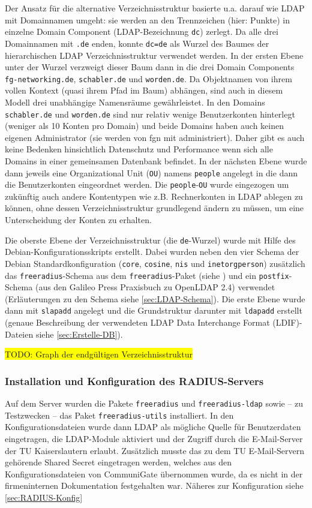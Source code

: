 \documentclass[11pt,a4paper,titlepage=firstiscover,headsepline,bibtotoc]{scrartcl} %
\newcommand{\hilight}[1]{\colorbox{yellow}{#1}} %
\begin{document}
Der Ansatz für die alternative Verzeichnisstruktur basierte u.a. darauf wie LDAP mit Domainnamen umgeht: sie werden an den Trennzeichen (hier: Punkte) in einzelne Domain Component (LDAP-Bezeichnung \texttt{dc}) zerlegt. Da alle drei Domainnamen mit \texttt{.de} enden, konnte \texttt{dc=de} als Wurzel des Baumes der hierarchischen LDAP Verzeichnisstruktur verwendet werden. In der ersten Ebene unter der Wurzel verzweigt dieser Baum dann in die drei Domain Components  \texttt{fg-networking.de}, \texttt{schabler.de} und \texttt{worden.de}. Da Objektnamen von ihrem vollen Kontext (quasi ihrem Pfad im Baum) abhängen, sind auch in diesem Modell drei unabhängige Namensräume gewährleistet. In den Domains \texttt{schabler.de} und \texttt{worden.de} sind nur relativ wenige Benutzerkonten hinterlegt (weniger als 10 Konten pro Domain) und beide Domains haben auch keinen eigenen Administrator (sie werden von fgn mit administriert). Daher gibt es auch keine Bedenken hinsichtlich Datenschutz und Performance wenn sich alle Domains in einer gemeinsamen Datenbank befindet. In der nächsten Ebene wurde dann jeweils eine Organizational Unit (\texttt{OU}) namens \texttt{people} angelegt in die dann die Benutzerkonten eingeordnet werden. Die \texttt{people}-\texttt{OU} wurde eingezogen um zukünftig auch andere Kontentypen wie z.B. Rechnerkonten in LDAP ablegen zu können, ohne dessen Verzeichnisstruktur grundlegend ändern zu müssen, um eine Unterscheidung der Konten zu erhalten.

Die oberste Ebene der Verzeichnisstruktur (die \texttt{de}-Wurzel) wurde mit Hilfe des Debian-Konfigurationsskripts erstellt. Dabei wurden neben den vier Schema der Debian Standardkonfiguration (\texttt{core}, \texttt{cosine}, \texttt{nis} und \texttt{inetorgperson}) zusätzlich das \texttt{freeradius}-Schema aus dem \texttt{freeradius}-Paket (siehe ) und ein \texttt{postfix}-Schema (aus den Galileo Press Praxisbuch zu OpenLDAP 2.4) verwendet (Erläuterungen zu den Schema siehe \autoref{sec:LDAP-Schema}). Die erste Ebene wurde dann mit \texttt{slapadd} angelegt und die Grundstruktur darunter mit \texttt{ldapadd} erstellt (genaue Beschreibung der verwendeten LDAP Data Interchange Format (LDIF)-Dateien siehe \autoref{sec:Erstelle-DB}).

\hilight{TODO: Graph der endgültigen Verzeichnisstruktur}

\subsubsection{Installation und Konfiguration des RADIUS-Servers}\label{sec:RADIUS-Konf}
Auf dem Server wurden die Pakete \texttt{freeradius} und \texttt{freeradius-ldap} sowie -- zu Testzwecken -- das Paket \texttt{freeradius-utils} installiert. In den Konfigurationsdateien wurde dann LDAP als mögliche Quelle für Benutzerdaten eingetragen, die LDAP-Module aktiviert und der Zugriff durch die E-Mail-Server der TU Kaiserslautern erlaubt. Zusätzlich musste das zu dem TU E-Mail-Servern gehörende Shared Secret eingetragen werden, welches aus den Konfigurationsdateien von CommuniGate übernommen wurde, da es nicht in der firmeninternen Dokumentation festgehalten war. Näheres zur Konfiguration siehe \autoref{sec:RADIUS-Konfig}
\end{document}
